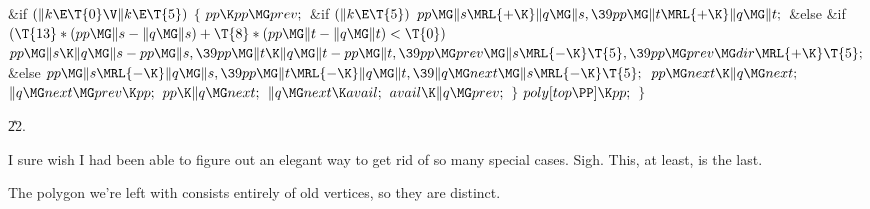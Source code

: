 \&{if} ${}(\|k\E\T{0}\V\|k\E\T{5}){}$\5
${}\{{}$\1\6
${}\\{pp}\K\\{pp}\MG\\{prev};{}$\6
\&{if} ${}(\|k\E\T{5}){}$\1\5
${}\\{pp}\MG\|s\MRL{+{\K}}\|q\MG\|s,\39\\{pp}\MG\|t\MRL{+{\K}}\|q\MG\|t;{}$\2\6
\&{else} \&{if} ${}(\T{13}*(\\{pp}\MG\|s-\|q\MG\|s)+\T{8}*(\\{pp}\MG\|t-\|q\MG%
\|t)<\T{0}){}$\1\5
${}\\{pp}\MG\|s\K\|q\MG\|s-\\{pp}\MG\|s,\39\\{pp}\MG\|t\K\|q\MG\|t-\\{pp}\MG%
\|t,\39\\{pp}\MG\\{prev}\MG\|s\MRL{-{\K}}\T{5},\39\\{pp}\MG\\{prev}\MG\\{dir}%
\MRL{+{\K}}\T{5};{}$\2\6
\&{else}\1\5
${}\\{pp}\MG\|s\MRL{-{\K}}\|q\MG\|s,\39\\{pp}\MG\|t\MRL{-{\K}}\|q\MG\|t,\39\|q%
\MG\\{next}\MG\|s\MRL{-{\K}}\T{5};{}$\2\6
${}\\{pp}\MG\\{next}\K\|q\MG\\{next};{}$\6
${}\|q\MG\\{next}\MG\\{prev}\K\\{pp};{}$\6
${}\\{pp}\K\|q\MG\\{next};{}$\6
${}\|q\MG\\{next}\K\\{avail};{}$\6
${}\\{avail}\K\|q\MG\\{prev};{}$\6
\4${}\}{}$\2\6
${}\\{poly}[\\{top}\PP]\K\\{pp};{}$\6
\4${}\}{}$\2\par
\U22.\fi

I sure wish I had been able to figure out an elegant way to get rid of
so many special cases. Sigh. This, at least, is the last.

The polygon we're left with consists entirely of old vertices, so they
are distinct.

